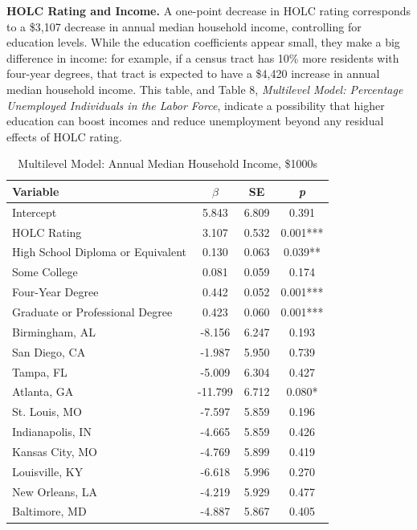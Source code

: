 \documentclass[paper=letter, fontsize=12pt]{scrartcl} %
\begin{document}
	\begin{table}
		\textbf{HOLC Rating and Income.} A one-point decrease in HOLC rating corresponds to a \$3,107 decrease in annual median household income, controlling for education levels. While the education coefficients appear small, they make a big difference in income: for example, if a census tract has 10\% more residents with four-year degrees, that tract is expected to have a \$4,420 increase in annual median household income. This table, and Table 8, \textit{Multilevel Model: Percentage Unemployed Individuals in the Labor Force}, indicate a possibility that higher education can boost incomes and reduce unemployment beyond any residual effects of HOLC rating.
		\caption{Multilevel Model: Annual Median Household Income, \$1000s}
		\begin{center}
			\begin{tabular}{|| l | c c c ||}
				\hline
				Variable & $\beta$ & SE & \textit{p}\\
				\hline \hline
				Intercept & 5.843 & 6.809 & 0.391\\ 
				\hline 
				HOLC Rating & 3.107 & 0.532 & 0.001***\\ 
				\hline 
				High School Diploma or Equivalent & 0.130 & 0.063 & 0.039**\\ 
				\hline 
				Some College &0.081 & 0.059 & 0.174\\ 
				\hline 
				Four-Year Degree &0.442 & 0.052 & 0.001***\\ 
				\hline 
				Graduate or Professional Degree &0.423 & 0.060 & 0.001***\\ 
				\hline 
				Birmingham, AL & -8.156 & 6.247 & 0.193\\ 
				\hline 
				San Diego, CA & -1.987 & 5.950 & 0.739\\ 
				\hline 
				Tampa, FL & -5.009 & 6.304 & 0.427\\ 
				\hline 
				Atlanta, GA & -11.799 & 6.712 & 0.080*\\ 
				\hline 
				St. Louis, MO & -7.597 & 5.859 & 0.196\\ 
				\hline 
				Indianapolis, IN & -4.665 & 5.859 & 0.426\\ 
				\hline 
				Kansas City, MO & -4.769 & 5.899 & 0.419\\ 
				\hline 
				Louisville, KY & -6.618 & 5.996 & 0.270\\ 
				\hline 
				New Orleans, LA & -4.219 & 5.929 & 0.477\\ 
				\hline 
				Baltimore, MD & -4.887 & 5.867 & 0.405\\ 

\end{tabular}
\end{center}
\end{table}
\end{document}
